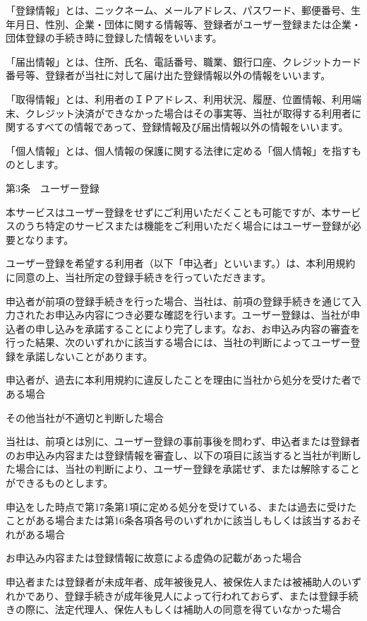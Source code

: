     「登録情報」とは、ニックネーム、メールアドレス、パスワード、郵便番号、生年月日、性別、企業・団体に関する情報等、登録者がユーザー登録または企業・団体登録の手続き時に登録した情報をいいます。

    「届出情報」とは、住所、氏名、電話番号、職業、銀行口座、クレジットカード番号等、登録者が当社に対して届け出た登録情報以外の情報をいいます。

    「取得情報」とは、利用者のＩＰアドレス、利用状況、履歴、位置情報、利用端末、クレジット決済ができなかった場合はその事実等、当社が取得する利用者に関するすべての情報であって、登録情報及び届出情報以外の情報をいいます。

    「個人情報」とは、個人情報の保護に関する法律に定める「個人情報」を指すものとします。

第3条　ユーザー登録

    本サービスはユーザー登録をせずにご利用いただくことも可能ですが、本サービスのうち特定のサービスまたは機能をご利用いただく場合にはユーザー登録が必要となります。

    ユーザー登録を希望する利用者（以下「申込者」といいます。）は、本利用規約に同意の上、当社所定の登録手続きを行っていただきます。

    申込者が前項の登録手続きを行った場合、当社は、前項の登録手続きを通じて入力されたお申込み内容につき必要な確認を行います。ユーザー登録は、当社が申込者の申し込みを承諾することにより完了します。なお、お申込み内容の審査を行った結果、次のいずれかに該当する場合には、当社の判断によってユーザー登録を承諾しないことがあります。

        申込者が、過去に本利用規約に違反したことを理由に当社から処分を受けた者である場合

        その他当社が不適切と判断した場合

    当社は、前項とは別に、ユーザー登録の事前事後を問わず、申込者または登録者のお申込み内容または登録情報を審査し、以下の項目に該当すると当社が判断した場合には、当社の判断により、ユーザー登録を承諾せず、または解除することができるものとします。

        申込をした時点で第17条第1項に定める処分を受けている、または過去に受けたことがある場合または第16条各項各号のいずれかに該当しもしくは該当するおそれがある場合

        お申込み内容または登録情報に故意による虚偽の記載があった場合

        申込者または登録者が未成年者、成年被後見人、被保佐人または被補助人のいずれかであり、登録手続きが成年後見人によって行われておらず、または登録手続きの際に、法定代理人、保佐人もしくは補助人の同意を得ていなかった場合

